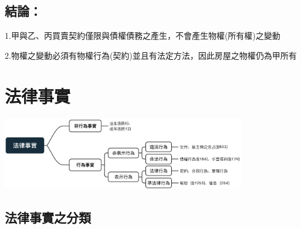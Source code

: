 \documentclass[
]{book}
\begin{document}
\hypertarget{ux7d50ux8ad6}{%
\subsection{結論：}\label{ux7d50ux8ad6}}

1.甲與乙、丙買賣契約僅限與債權債務之產生，不會產生物權(所有權)之變動

2.物權之變動必須有物權行為(契約)並且有法定方法，因此房屋之物權仍為甲所有

\hypertarget{ux6cd5ux5f8bux4e8bux5be6}{%
\section{法律事實}\label{ux6cd5ux5f8bux4e8bux5be6}}

\includegraphics[width=0.8\textwidth,height=\textheight]{www/權利變動1.png}

\hypertarget{ux6cd5ux5f8bux4e8bux5be6ux4e4bux5206ux985e}{%
\subsection{法律事實之分類}\label{ux6cd5ux5f8bux4e8bux5be6ux4e4bux5206ux985e}}
\end{document}

